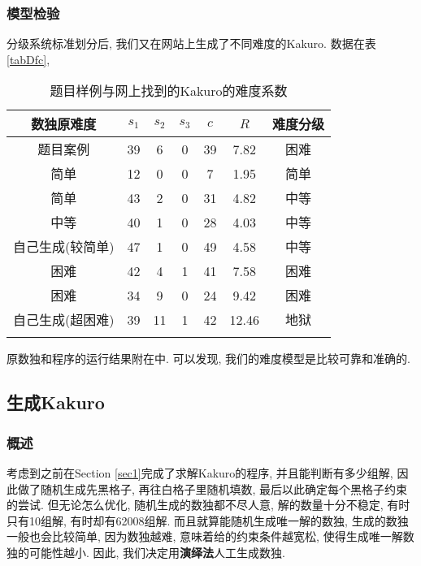     \subsubsection{模型检验}
        分级系统标准划分后, 我们又在网站上生成了不同难度的Kakuro. 数据在表\vref*{tabDfc},
        \begin{table}[htb]
            \begin{center}
                \caption[难度系数]{题目样例与网上找到的Kakuro的难度系数}\label{tabDfc}
                \begin{tabular}{ccccccc}
                    \Xhline{1.2pt}
                    数独原难度  &   $s_{1}$   &   $s_{2}$  &   $s_{3}$   &   $c$   &   $R$  &   难度分级\\
                    \hline
                    题目案例                      &   39  &   6   &   0   &   39  &   7.82    &   困难\\
                    简单\citep{kakuros.com}       &   12  &   0   &   0   &   7   &   1.95    &   简单\\
                    简单\citep[ID: 205183]{kkrOL} &   43  &   2   &   0   &   31  &   4.82    &   中等\\
                    中等\citep[ID: 205226]{kkrOL} &   40  &   1   &   0   &   28  &   4.03    &   中等\\
                    自己生成(较简单)              &   47  &   1   &   0   &   49  &   4.58    &   中等\\
                    困难\citep[ID: 205191]{kkrOL} &   42  &   4   &   1   &   41  &   7.58    &   困难\\
                    困难\citep[ID: 205190]{kkrOL} &   34  &   9   &   0   &   24  &   9.42    &   困难\\
                    自己生成(超困难)              &   39  &   11  &   1   &   42  &   12.46   &   地狱\\
                    \Xhline{1.2pt}
                \end{tabular}
            \end{center}
        \end{table}
        原数独和程序的运行结果附在中. 可以发现, 我们的难度模型是比较可靠和准确的.
        \FloatBarrier
    \subsection{生成Kakuro}
        \subsubsection{概述}
            考虑到之前在Section \ref{sec1}完成了求解Kakuro的程序, 并且能判断有多少组解,
            因此做了随机生成先黑格子, 再往白格子里随机填数, 最后以此确定每个黑格子约束的尝试.
            但无论怎么优化, 随机生成的数独都不尽人意,
            解的数量十分不稳定, 有时只有10组解, 有时却有62008组解.
            而且就算能随机生成唯一解的数独, 生成的数独一般也会比较简单,
            因为数独越难, 意味着给的约束条件越宽松,
            使得生成唯一解数独的可能性越小.
            因此, 我们决定用\textbf{演绎法}人工生成数独.

